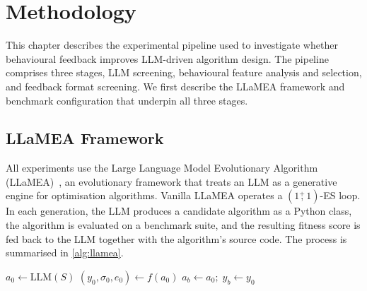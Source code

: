 
\chapter{Methodology}
\label{ch:methodology}

This chapter describes the experimental pipeline used to investigate whether behavioural feedback improves LLM-driven algorithm design. The pipeline comprises three stages, LLM screening, behavioural feature analysis and selection, and feedback format screening. We first describe the LLaMEA framework and benchmark configuration that underpin all three stages.

\section{LLaMEA Framework}
\label{sec:meth-llamea}

All experiments use the Large Language Model Evolutionary Algorithm (LLaMEA)~\cite{vanStein2024LLaMEA}, an evolutionary framework that treats an LLM as a generative engine for optimisation algorithms. Vanilla LLaMEA operates a $(1 \stackrel{+}{,} 1)$-ES loop. In each generation, the LLM produces a candidate algorithm as a Python class, the algorithm is evaluated on a benchmark suite, and the resulting fitness score is fed back to the LLM together with the algorithm's source code. The process is summarised in \cref{alg:llamea}.

\begin{algorithm}[t]
\caption{$(1+1)$-LLaMEA evolutionary loop, adapted from \cite{vanStein2024LLaMEA}.}
\label{alg:llamea}
$a_0 \gets \text{LLM}(S)$\;
$(y_0, \sigma_0, e_0) \gets f(a_0)$\;
$a_b \gets a_0;\; y_b \gets y_0$\;
\end{algorithm}

